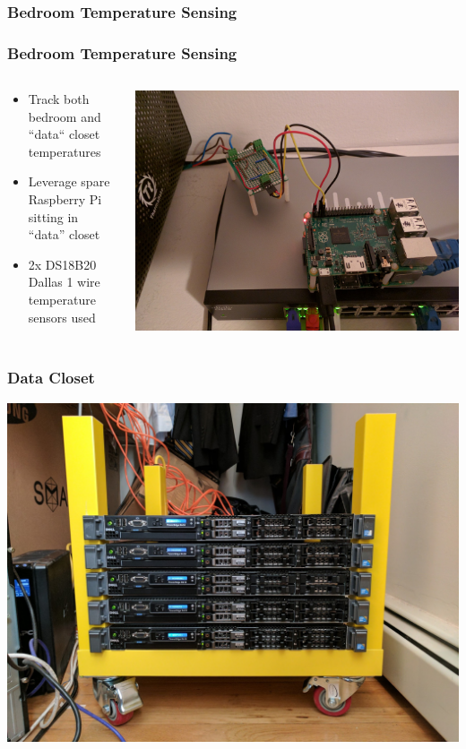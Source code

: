 \documentclass[aspectratio=169,11pt,hyperref={colorlinks=true}]{beamer}
\begin{document}
\subsubsection{Bedroom Temperature Sensing}
\begin{frame}
    \frametitle{Bedroom Temperature Sensing}
    \begin{columns}[T]
        \begin{column}{.48\textwidth}
            \begin{itemize}
                \item Track both bedroom and ``data`` closet temperatures
                \item Leverage spare Raspberry Pi sitting in ``data'' closet
                \item 2x DS18B20 Dallas 1 wire temperature sensors used
            \end{itemize}
        \end{column}
        \begin{column}{.48\textwidth}
            \centering
            \includegraphics[width=\textwidth]{raspi.jpg}
        \end{column}
    \end{columns}
\end{frame}

\begin{frame}
    \frametitle{Data Closet}
    \centering
    \includegraphics[width=.75\textwidth]{data_closet.jpg}
\end{frame}
\end{document}
